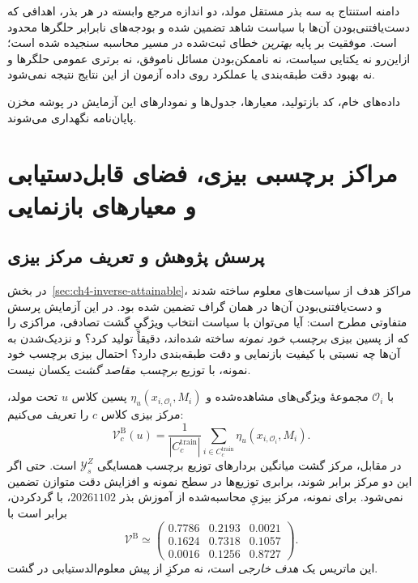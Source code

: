 دامنه استنتاج به سه بذر مستقل مولد، دو اندازه مرجع وابسته در هر بذر، اهدافی که دست‌یافتنی‌بودن آن‌ها با سیاست شاهد تضمین شده و بودجه‌های نابرابر حلگرها محدود است. موفقیت بر پایه \emph{بهترین} خطای ثبت‌شده در مسیر محاسبه سنجیده شده است؛ ازاین‌رو نه یکتایی سیاست، نه ناممکن‌بودن مسائل ناموفق، نه برتری عمومی حلگرها و نه بهبود دقت طبقه‌بندی یا عملکرد روی داده آزمون از این نتایج نتیجه نمی‌شود.

داده‌های خام، کد بازتولید، معیارها، جدول‌ها و نمودارهای این آزمایش در پوشه  مخزن پایان‌نامه نگهداری می‌شوند.

\section{مراکز برچسبی بیزی، فضای قابل‌دستیابی و معیارهای بازنمایی}
\label{sec:ch4-bayes-center-inverse}

\subsection{پرسش پژوهش و تعریف مرکز بیزی}
\label{subsec:ch4-bayes-target}
در بخش~\ref{sec:ch4-inverse-attainable}، مراکز هدف از سیاست‌های معلوم ساخته شدند و دست‌یافتنی‌بودن آن‌ها در همان گراف تضمین شده بود. در این آزمایش پرسش متفاوتی مطرح است: آیا می‌توان با سیاست انتخاب ویژگیِ گشت تصادفی، مراکزی را که از پسین بیزی \emph{برچسب خود نمونه} ساخته شده‌اند، دقیقاً تولید کرد؟ و نزدیک‌شدن به آن‌ها چه نسبتی با کیفیت بازنمایی و دقت طبقه‌بندی دارد؟ احتمال بیزی برچسب خود نمونه، با توزیع \emph{برچسب مقاصد گشت} یکسان نیست.

با $\mathcal O_i$ مجموعهٔ ویژگی‌های مشاهده‌شده و $\eta_u(x_{i,\mathcal O_i},M_i)$ پسین کلاس $u$ تحت مولد، مرکز بیزی کلاس $c$ را تعریف می‌کنیم:
\begin{equation}\label{eq:ch4-bayes-target-center}
\boxed{\displaystyle
\mathcal V_c^{\mathrm B}(u)=\frac{1}{|C_c^{\mathrm{train}}|}
\sum_{i\in C_c^{\mathrm{train}}}\eta_u(x_{i,\mathcal O_i},M_i).}
\end{equation}
در مقابل، مرکز گشت میانگین بردارهای توزیع برچسب همسایگی $\mathscr Y_s^Z$ است. حتی اگر این دو مرکز برابر شوند، برابری توزیع‌ها در سطح نمونه و افزایش دقت متوازن تضمین نمی‌شود. برای نمونه، مرکز بیزیِ محاسبه‌شده از آموزش بذر $20261102$، با گردکردن، برابر است با
\begin{equation}\label{eq:ch4-bayes-target-values}
\mathcal V^{\mathrm B}\simeq
\begin{pmatrix}
0.7786&0.2193&0.0021\\
0.1624&0.7318&0.1057\\
0.0016&0.1256&0.8727
\end{pmatrix}.
\end{equation}
این ماتریس یک \emph{هدف خارجی} است، نه مرکزِ از پیش معلوم‌الدستیابی در گشت.

